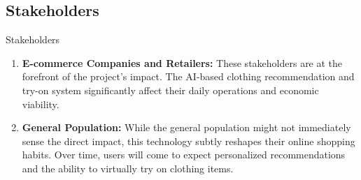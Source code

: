 \subsection{Stakeholders}
\begin{frame}{Stakeholders}
	\begin{enumerate}
		\item \textbf{E-commerce Companies and Retailers:} These stakeholders are at the forefront of the project's impact. The AI-based clothing recommendation and try-on system significantly affect their daily operations and economic viability.
		\item \textbf{General Population:} While the general population might not immediately sense the direct impact, this technology subtly reshapes their online shopping habits. Over time, users will come to expect personalized recommendations and the ability to virtually try on clothing items.
	\end{enumerate}
\end{frame}